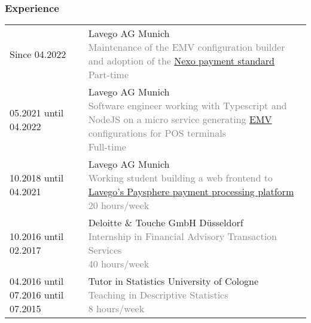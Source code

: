 \documentclass[USenglish]{article} %
\begin{document}
\subsubsection*{Experience}
\begin{table}[h]
  \begin{tabularx}{\textwidth}{@{}p{4cm}X}

    Since 04.2022 &
    Lavego AG \textbar{} Munich
    \textcolor{gray}{
      \newline Maintenance of the EMV configuration builder and adoption of the
        \href{https://www.nexo-standards.org}{Nexo payment standard}
      \newline Part-time} \\

    05.2021 until 04.2022 &
    Lavego AG \textbar{} Munich
    \textcolor{gray}{
      \newline Software engineer working with Typescript and NodeJS on a micro service
        generating \href{https://www.emvco.com}{EMV} configurations for POS terminals
      \newline Full-time} \\

    10.2018 until 04.2021 &
    Lavego AG \textbar{} Munich
    \textcolor{gray}{
      \newline Working student building a web frontend to 
        \href{https://www.nexo-standards.org/news/reinventing-wheel-how-lavego-ag-brought-innovation-pos-nexo-standards}{Lavego's Paysphere payment processing platform}
      \newline 20 hours/week} \\

    10.2016 until 02.2017 &
    Deloitte \& Touche GmbH \textbar{} Düsseldorf
    \textcolor{gray}{
      \newline Internship in Financial Advisory Transaction Services
      \newline 40 hours/week} \\

    04.2016 until 07.2016 \newline
    10.2014 until 07.2015 &
    Tutor in Statistics \textbar{} University of Cologne
    \textcolor{gray}{
      \newline Teaching in Descriptive Statistics
      \newline 8 hours/week} \\

  \end{tabularx}\label{tab:experience}
\end{table}
\end{document}
